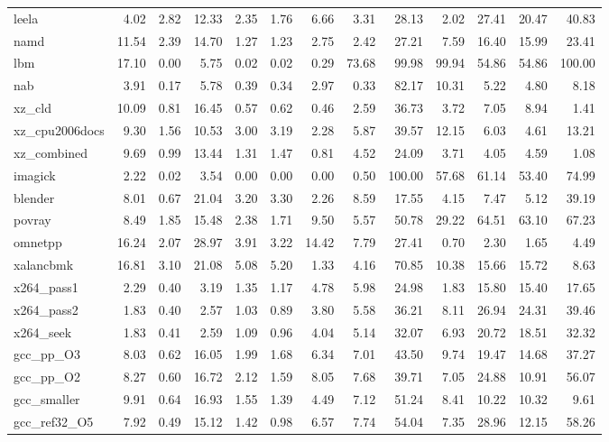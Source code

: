 \documentclass[10pt,a4paper]{article}
\begin{document}
{\begin{longtable}{@{}lrrrrrrrrrrrr@{}}
leela & 4.02 & 2.82 & 12.33 & 2.35 & 1.76 & 6.66 & 3.31 & 28.13 & 2.02 & 27.41 & 20.47 & 40.83 \\
namd & 11.54 & 2.39 & 14.70 & 1.27 & 1.23 & 2.75 & 2.42 & 27.21 & 7.59 & 16.40 & 15.99 & 23.41 \\
lbm & 17.10 & 0.00 & 5.75 & 0.02 & 0.02 & 0.29 & 73.68 & 99.98 & 99.94 & 54.86 & 54.86 & 100.00 \\
nab & 3.91 & 0.17 & 5.78 & 0.39 & 0.34 & 2.97 & 0.33 & 82.17 & 10.31 & 5.22 & 4.80 & 8.18 \\
xz\_cld & 10.09 & 0.81 & 16.45 & 0.57 & 0.62 & 0.46 & 2.59 & 36.73 & 3.72 & 7.05 & 8.94 & 1.41 \\
xz\_cpu2006docs & 9.30 & 1.56 & 10.53 & 3.00 & 3.19 & 2.28 & 5.87 & 39.57 & 12.15 & 6.03 & 4.61 & 13.21 \\
xz\_combined & 9.69 & 0.99 & 13.44 & 1.31 & 1.47 & 0.81 & 4.52 & 24.09 & 3.71 & 4.05 & 4.59 & 1.08 \\
imagick & 2.22 & 0.02 & 3.54 & 0.00 & 0.00 & 0.00 & 0.50 & 100.00 & 57.68 & 61.14 & 53.40 & 74.99 \\
blender & 8.01 & 0.67 & 21.04 & 3.20 & 3.30 & 2.26 & 8.59 & 17.55 & 4.15 & 7.47 & 5.12 & 39.19 \\
povray & 8.49 & 1.85 & 15.48 & 2.38 & 1.71 & 9.50 & 5.57 & 50.78 & 29.22 & 64.51 & 63.10 & 67.23 \\
omnetpp & 16.24 & 2.07 & 28.97 & 3.91 & 3.22 & 14.42 & 7.79 & 27.41 & 0.70 & 2.30 & 1.65 & 4.49 \\
xalancbmk & 16.81 & 3.10 & 21.08 & 5.08 & 5.20 & 1.33 & 4.16 & 70.85 & 10.38 & 15.66 & 15.72 & 8.63 \\
x264\_pass1 & 2.29 & 0.40 & 3.19 & 1.35 & 1.17 & 4.78 & 5.98 & 24.98 & 1.83 & 15.80 & 15.40 & 17.65 \\
x264\_pass2 & 1.83 & 0.40 & 2.57 & 1.03 & 0.89 & 3.80 & 5.58 & 36.21 & 8.11 & 26.94 & 24.31 & 39.46 \\
x264\_seek & 1.83 & 0.41 & 2.59 & 1.09 & 0.96 & 4.04 & 5.14 & 32.07 & 6.93 & 20.72 & 18.51 & 32.32 \\
gcc\_pp\_O3 & 8.03 & 0.62 & 16.05 & 1.99 & 1.68 & 6.34 & 7.01 & 43.50 & 9.74 & 19.47 & 14.68 & 37.27 \\
gcc\_pp\_O2 & 8.27 & 0.60 & 16.72 & 2.12 & 1.59 & 8.05 & 7.68 & 39.71 & 7.05 & 24.88 & 10.91 & 56.07 \\
gcc\_smaller & 9.91 & 0.64 & 16.93 & 1.55 & 1.39 & 4.49 & 7.12 & 51.24 & 8.41 & 10.22 & 10.32 & 9.61 \\
gcc\_ref32\_O5 & 7.92 & 0.49 & 15.12 & 1.42 & 0.98 & 6.57 & 7.74 & 54.04 & 7.35 & 28.96 & 12.15 & 58.26 \\

\end{longtable}}
\end{document}

